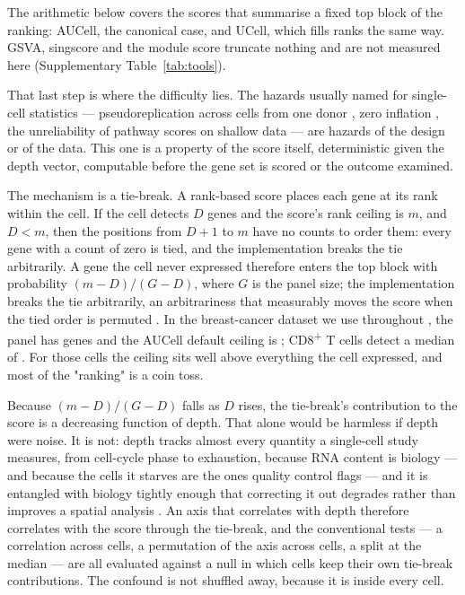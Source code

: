 \documentclass[11pt]{article}
\begin{document}
The arithmetic below covers the scores that summarise a fixed top block of the
ranking: AUCell, the canonical case, and UCell, which fills ranks the same way.
GSVA, singscore and the module score truncate nothing and are not measured here
(Supplementary Table~\ref{tab:tools}).

That last step is where the difficulty lies. The
hazards usually named for single-cell statistics --- pseudoreplication across
cells from one donor \citep{squair2021,zimmerman2021}, zero inflation
\citep{svensson2020,hicks2017}, the
unreliability of pathway scores on shallow data \citep{holland2020} --- are
hazards of the design or of the data. This one is a property of the score itself, deterministic given the depth
vector, computable before the gene set is scored or the outcome examined.

The mechanism is a tie-break. A rank-based score places each gene at its rank
within the cell. If the cell detects $D$ genes and the score's rank ceiling is
$m$, and $D < m$, then the positions from $D+1$ to $m$ have no counts to
order them: every gene with a count of zero is tied, and the implementation
breaks the tie arbitrarily. A gene the cell never expressed therefore enters the
top block with probability $(m-D)/(G-D)$, where $G$ is the panel size; the
implementation breaks the tie arbitrarily, an arbitrariness that measurably
moves the score when the tied order is permuted \citep{wenzel2024}. In
the breast-cancer dataset we use throughout \citep{wu2021}, the panel has
\panelGenes{} genes and the AUCell default ceiling is \maxRank{}; CD8\textsuperscript{+}
T cells detect a median of \benchMedianDetectedCdT{}. For those cells the ceiling sits well
above everything the cell expressed, and most of the "ranking" is a coin toss.

Because $(m-D)/(G-D)$ falls as $D$ rises, the tie-break's contribution to
the score is a decreasing function of depth. That alone would be harmless if
depth were noise. It is not: depth tracks almost every quantity a single-cell
study measures, from cell-cycle phase to exhaustion, because RNA content is
biology --- and because the cells it starves are the ones quality control
flags \citep{ilicic2016} --- and it is entangled with biology tightly enough that correcting it out
degrades rather than improves a spatial analysis \citep{bhuva2024}. An axis that
correlates with depth therefore correlates with the score
through the tie-break, and the conventional tests --- a correlation across
cells, a permutation of the axis across cells, a split at the median --- are
all evaluated against a null in which cells keep their own tie-break
contributions. The confound is not shuffled away, because it is inside every
cell.
\end{document}
